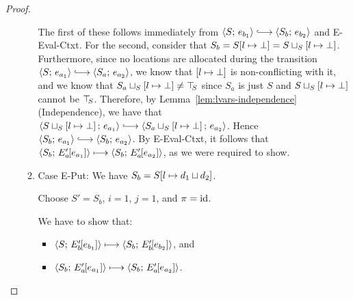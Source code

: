 \begin{proof}
\begin{enumerate}
\begin{enumerate}
      The first of these follows immediately from $\config{S}{e_{b_1}}
      \parstepsto \config{S_b}{e_{b_2}}$ and {\sc E-Eval-Ctxt}.  For
      the second, consider that $S_b = S[l \mapsto \bot] =
      S \sqcup_{S} \left[ l \mapsto \bot \right]$.  Furthermore,
      since no locations are allocated during the transition
      $\config{S}{e_{a_1}} \parstepsto \config{S_a}{e_{a_2}}$, we know
      that $\left[ l \mapsto \bot \right]$ is non-conflicting with
      it, and we know that
      $S_a \sqcup_{S} \left[ l \mapsto \bot \right] \neq \top\hspace{-0.85mm}_{S}$
      since $S_a$ is just $S$ and
      $S \sqcup_{S} \left[ l \mapsto \bot \right]$ cannot be
      $\top\hspace{-0.85mm}_{S}$.  Therefore, by Lemma~\ref{lem:lvars-independence}
      (Independence), we have that
      $\config{\lubstore{S}{\store{\storebindingRaw{l}{\bot}}}}{e_{a_1}}
      \parstepsto
      \config{\lubstore{S_a}{\store{\storebindingRaw{l}{\bot}}}}{e_{a_2}}$.
      Hence $\config{S_b}{e_{a_1}} \parstepsto \config{S_b}{e_{a_2}}$.
      By {\sc E-Eval-Ctxt}, it follows that
      $\langle S_b;\, E'_a\hspace{-1mm}\left[e_{a_1}\right] \rangle \longmapsto
      \langle S_b;\, E'_a\hspace{-1mm}\left[e_{a_2}\right] \rangle$, as we were required to
      show.

    \item \label{lvars-slc-beta-put}Case {\sc E-Put}: We have $S_b =
      S[l \mapsto d_1 \sqcup d_2]$.

      Choose $S' = S_b$, $i = 1$, $j = 1$, and $\pi = \mathrm{id}$.

      We have to show that:
      \begin{itemize}
      \item $\langle S;\, E'_b\hspace{-1mm}\left[e_{b_1}\right] \rangle \longmapsto
        \langle S_b;\, E'_b\hspace{-1mm}\left[e_{b_2}\right] \rangle$, and
      \item
        $\langle S_b;\, E'_a\hspace{-1mm}\left[e_{a_1}\right] \rangle \longmapsto
        \langle S_b;\, E'_a\hspace{-1mm}\left[e_{a_2}\right] \rangle$.
      \end{itemize}


\end{enumerate}
\end{enumerate}
\end{proof}
